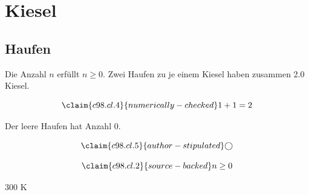 \chapter{Kiesel}\label{c98}
\section{Haufen}\label{c98.s1}

\begin{theorem}[Anzahl]\label{c98.thm.count}
  Die Anzahl $n$ erfüllt $n \geq 0$.
  Zwei Haufen zu je einem Kiesel haben zusammen
  \num[c98.cl.4]{2.0}{} Kiesel.
\end{theorem}

\begin{equation}\label{c98.eq.sum}\claim{c98.cl.4}{numerically-checked}
  1 + 1 = 2
\end{equation}

\begin{lemma}[Leer]\label{c98.lem.empty}
  Der leere Haufen hat Anzahl $0$.
\end{lemma}

\begin{equation}\label{c98.eq.circle}\claim{c98.cl.5}{author-stipulated}
  \bigcirc
\end{equation}

\begin{vertiefung}[id=c98.v1, titel={T}, wozu={W}, voraussetzung={V}, zurueck={Z}]
  \begin{equation}\label{c98.eq.page}\claim{c98.cl.2}{source-backed}
    n \geq 0
  \end{equation}
\end{vertiefung}

$\text{300 K}$

